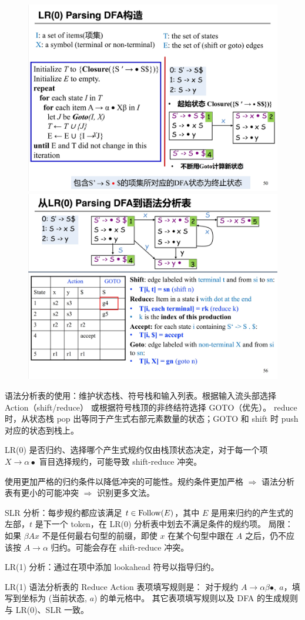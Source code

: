 \begin{figure}[H]
    \centering
    \includegraphics[width=0.48\linewidth]{figures/lr0-3.png}
    \includegraphics[width=0.48\linewidth]{figures/lr0-4.png}
\end{figure}

\par \noindent 语法分析表的使用：维护状态栈、符号栈和输入列表。根据输入流头部选择 Action（shift/reduce） 或根据符号栈顶的非终结符选择 GOTO（优先）。
reduce 时，从状态栈 pop 出等同于产生式右部元素数量的状态；GOTO 和 shift 时 push 对应的状态到栈上。

\par \noindent LR(0) 是否归约、选择哪个产生式规约仅由栈顶状态决定，对于每一个项 $X \rightarrow \alpha \bullet$ 盲目选择规约，可能导致 shift-reduce 冲突。

\par \noindent 使用更加严格的归约条件以降低冲突的可能性。规约条件更加严格 $\Rightarrow$ 语法分析表有更小的可能冲突 $\Rightarrow$ 识别更多文法。

\par \noindent SLR 分析：每步规约都应该满足 $t \in \operatorname{Follow}(E)$，其中 $E$ 是用来归约的产生式的左部，$t$ 是下一个 token，在 LR(0) 分析表中划去不满足条件的规约项。
局限：如果 $\beta A x$ 不是任何最右句型的前缀，即使 $x$ 在某个句型中跟在 $A$ 之后，仍不应该按 $A \rightarrow \alpha$ 归约。可能会存在 shift-reduce 冲突。

\par \noindent LR(1) 分析：通过在项中添加 lookahead 符号以指导归约。

\par \noindent LR(1) 语法分析表的 Reduce Action 表项填写规则是：
对于规约 $A \rightarrow \alpha \beta \bullet,\ a$，填写到坐标为 (当前状态, $a$) 的单元格中。
其它表项填写规则以及 DFA 的生成规则与 LR(0)、SLR 一致。

